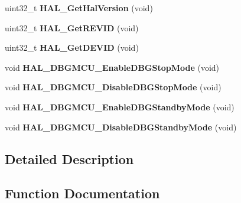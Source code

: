 \begin{DoxyCompactItemize}
uint32\+\_\+t {\bfseries H\+A\+L\+\_\+\+Get\+Hal\+Version} (void)
\item 
\mbox{\label{group___h_a_l___exported___functions___group2_gae051ef9e932404b21f5877c7186406b8}} 
uint32\+\_\+t {\bfseries H\+A\+L\+\_\+\+Get\+R\+E\+V\+ID} (void)
\item 
\mbox{\label{group___h_a_l___exported___functions___group2_gaff785f069ed650de77ff82ac407f7c84}} 
uint32\+\_\+t {\bfseries H\+A\+L\+\_\+\+Get\+D\+E\+V\+ID} (void)
\item 
\mbox{\label{group___h_a_l___exported___functions___group2_gadf25043b17de4bef38a95a75fd03e5c4}} 
void {\bfseries H\+A\+L\+\_\+\+D\+B\+G\+M\+C\+U\+\_\+\+Enable\+D\+B\+G\+Stop\+Mode} (void)
\item 
\mbox{\label{group___h_a_l___exported___functions___group2_ga2c93dcee35e5983d74f1000de7c042d5}} 
void {\bfseries H\+A\+L\+\_\+\+D\+B\+G\+M\+C\+U\+\_\+\+Disable\+D\+B\+G\+Stop\+Mode} (void)
\item 
\mbox{\label{group___h_a_l___exported___functions___group2_ga28a1323b2eeb0a408c1cfdbfa0db5ead}} 
void {\bfseries H\+A\+L\+\_\+\+D\+B\+G\+M\+C\+U\+\_\+\+Enable\+D\+B\+G\+Standby\+Mode} (void)
\item 
\mbox{\label{group___h_a_l___exported___functions___group2_ga7faa58d8508ea3123b9f247a70379779}} 
void {\bfseries H\+A\+L\+\_\+\+D\+B\+G\+M\+C\+U\+\_\+\+Disable\+D\+B\+G\+Standby\+Mode} (void)
\end{DoxyCompactItemize}


\subsection{Detailed Description}


\subsection{Function Documentation}
\mbox{\label{group___h_a_l___exported___functions___group2_ga24e0ee9dae1ec0f9d19200f5575ff790}} 

